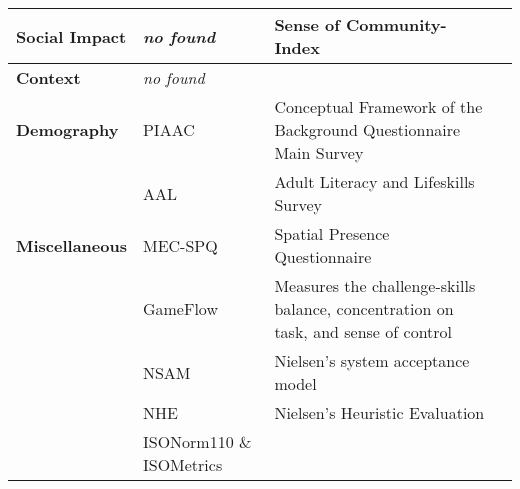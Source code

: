 \begin{tabular}{p{3.5cm}p{4.5cm}p{7.5cm}c}
\textbf{Social Impact} & \textit{no found} & Sense of Community-Index & \cite{Ballagas2005, cheverst2005hermes, Cheverst2008}   \\ \hline



\textbf{Context} & \textit{no found} &  &   \\ \hline



\textbf{Demography} & PIAAC & Conceptual Framework of the Background Questionnaire Main Survey & \\
& AAL & Adult Literacy and Lifeskills Survey & \cite{SurveysAAL} \\ \hline




\textbf{Miscellaneous} & MEC-SPQ \cite{MECSPEQQuestionnaire} & Spatial Presence Questionnaire & \cite{Huang2004, jacucci2010worldsofinformation}   \\
& GameFlow \cite{sweetser2005gameflow} & Measures the challenge-skills balance, concentration on task, and sense of control
 & \cite{Huang2004}  \\
& NSAM & Nielsen's system acceptance model & \cite{ojala2010ubi, jacucci2010worldsofinformation}  \\
& NHE \cite{nielsen1994usability} & Nielsen's Heuristic Evaluation & \\
& ISONorm110 \& ISOMetrics  & & \cite{Chur2014Questionnaires} \\


\bottomrule
\end{tabular}

